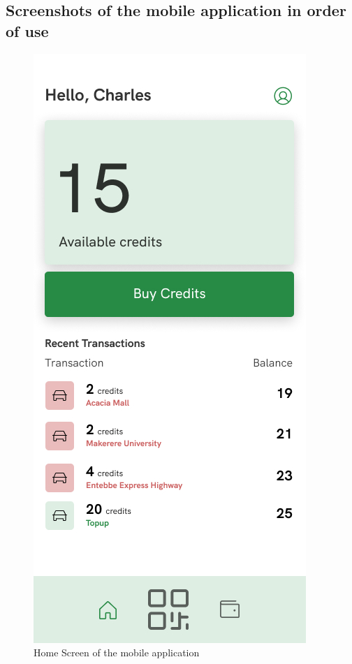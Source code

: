 \subsection{Screenshots of the mobile application in order of use}
\begin{figure}[h]
    \begin{center}
        \includegraphics[scale = 0.6]{images/Home}
        \caption{Home Screen of the mobile application}
    \end{center}
\end{figure}
\clearpage
